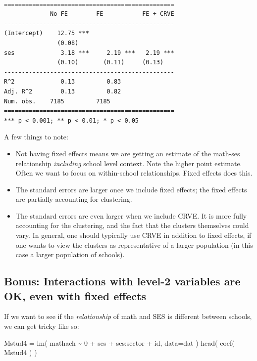 \documentclass[
  letterpaper,
  DIV=11,
  numbers=noendperiod]{scrreprt}
\newenvironment{Shaded}{\begin{snugshade}}{\end{snugshade}}
\newcommand{\AttributeTok}[1]{\textcolor[rgb]{0.49,0.56,0.16}{#1}}
\newcommand{\DecValTok}[1]{\textcolor[rgb]{0.25,0.63,0.44}{#1}}
\newcommand{\FunctionTok}[1]{\textcolor[rgb]{0.02,0.16,0.49}{#1}}
\newcommand{\NormalTok}[1]{\textcolor[rgb]{0.00,0.44,0.13}{#1}}
\newcommand{\OtherTok}[1]{\textcolor[rgb]{0.00,0.44,0.13}{#1}}
\newcommand{\SpecialCharTok}[1]{\textcolor[rgb]{0.25,0.44,0.63}{#1}}
\providecommand{\tightlist}{%
  \setlength{\itemsep}{0pt}\setlength{\parskip}{0pt}}\usepackage{longtable,booktabs,array}
\begin{document}
\begin{verbatim}

================================================
             No FE        FE           FE + CRVE
------------------------------------------------
(Intercept)    12.75 ***                        
               (0.08)                           
ses             3.18 ***     2.19 ***   2.19 ***
               (0.10)       (0.11)     (0.13)   
------------------------------------------------
R^2             0.13         0.83               
Adj. R^2        0.13         0.82               
Num. obs.    7185         7185                  
================================================
*** p < 0.001; ** p < 0.01; * p < 0.05
\end{verbatim}

A few things to note:

\begin{itemize}
\tightlist
\item
  Not having fixed effects means we are getting an estimate of the
  math-ses relationship \emph{including} school level context. Note the
  higher point estimate. Often we want to focus on within-school
  relationships. Fixed effects does this.
\item
  The standard errors are larger once we include fixed effects; the
  fixed effects are partially accounting for clustering.
\item
  The standard errors are even larger when we include CRVE. It is more
  fully accounting for the clustering, and the fact that the clusters
  themselves could vary. In general, one should typically use CRVE in
  addition to fixed effects, if one wants to view the clusters as
  representative of a larger population (in this case a larger
  population of schools).
\end{itemize}

\hypertarget{bonus-interactions-with-level-2-variables-are-ok-even-with-fixed-effects}{%
\subsection{Bonus: Interactions with level-2 variables are OK, even with
fixed
effects}\label{bonus-interactions-with-level-2-variables-are-ok-even-with-fixed-effects}}

If we want to see if the \emph{relationship} of math and SES is
different between schools, we can get tricky like so:

\begin{Shaded}
\begin{Highlighting}[]
\NormalTok{Mstud4 }\OtherTok{=} \FunctionTok{lm}\NormalTok{( mathach }\SpecialCharTok{\textasciitilde{}} \DecValTok{0} \SpecialCharTok{+}\NormalTok{ ses }\SpecialCharTok{+}\NormalTok{ ses}\SpecialCharTok{:}\NormalTok{sector }\SpecialCharTok{+}\NormalTok{ id, }\AttributeTok{data=}\NormalTok{dat )}
\FunctionTok{head}\NormalTok{( }\FunctionTok{coef}\NormalTok{( Mstud4 ) )}
\end{Highlighting}
\end{Shaded}
\end{document}
